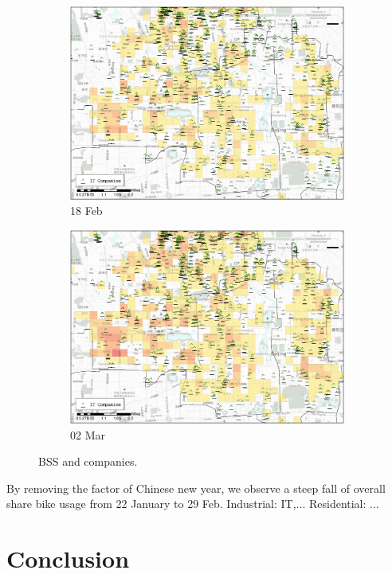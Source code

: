 \documentclass[preprints,ijgi,submit,moreauthors]{Definitions/mdpi}
\begin{document}
\begin{figure}[H]
\begin{subfigure}{.23\textwidth}
        \includegraphics[width=\textwidth]{Figures/Figure10/POI_compD2020_02_18.eps}
        \caption{18 Feb}
    \end{subfigure}
        \begin{subfigure}{.23\textwidth}
        \includegraphics[width=\textwidth]{Figures/Figure10/POI_compD2020_03_02.eps}
        \caption{02 Mar}
    \end{subfigure}
    \caption{BSS and companies.}
    \label{fig:BSS_companies}
\end{figure}

By removing the factor of Chinese new year, we observe a steep fall of overall share bike usage from 22 January to 29 Feb.
Industrial: IT,...
Residential: ...


\section{Conclusion}
\end{document}
